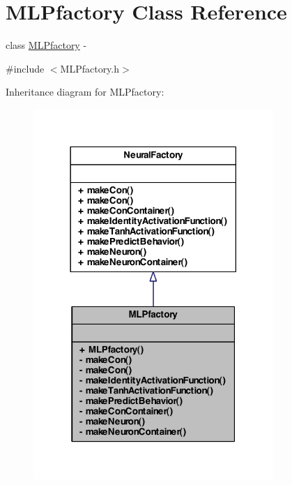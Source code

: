 \hypertarget{class_m_l_pfactory}{
\section{MLPfactory Class Reference}
\label{class_m_l_pfactory}
}


class \hyperlink{class_m_l_pfactory}{MLPfactory} -\/  




{\ttfamily \#include $<$MLPfactory.h$>$}



Inheritance diagram for MLPfactory:
\nopagebreak
\begin{figure}[H]
\begin{center}
\leavevmode
\includegraphics[width=258pt]{class_m_l_pfactory__inherit__graph}
\end{center}
\end{figure}


